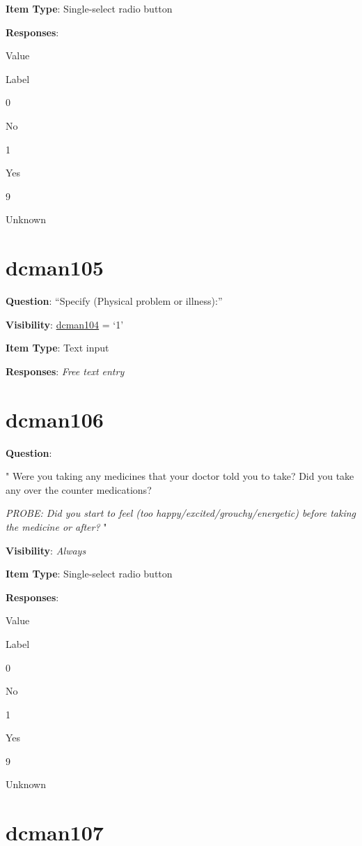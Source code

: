 \documentclass[]{book}
\begin{document}
\textbf{Item Type}: Single-select radio button

\textbf{Responses}:

Value

Label

0

No

1

Yes

9

Unknown

\hypertarget{dcman105}{%
\section{dcman105}\label{dcman105}}

\textbf{Question}: ``Specify (Physical problem or illness):''

\textbf{Visibility}: \protect\hyperlink{dcman104}{dcman104} = `1'

\textbf{Item Type}: Text input

\textbf{Responses}: \emph{Free text entry}

\hypertarget{dcman106}{%
\section{dcman106}\label{dcman106}}

\textbf{Question}:

"
Were you taking any medicines that your doctor told you to take? Did you take any over the counter medications?

\emph{PROBE: Did you start to feel (too happy/excited/grouchy/energetic) before taking the medicine or after? }"

\textbf{Visibility}: \emph{Always}

\textbf{Item Type}: Single-select radio button

\textbf{Responses}:

Value

Label

0

No

1

Yes

9

Unknown

\hypertarget{dcman107}{%
\section{dcman107}\label{dcman107}}
\end{document}

